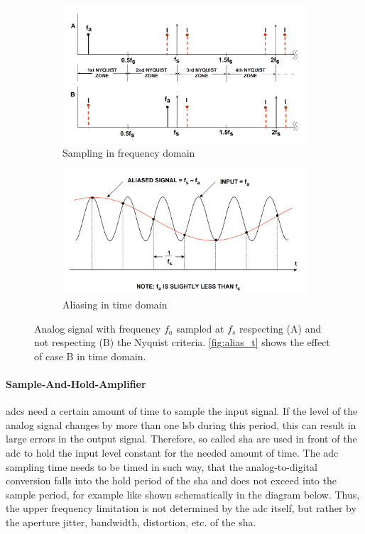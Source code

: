 \begin{figure}[tbh]
	\centering
	\begin{subfigure}{\textwidth}
		\centering
		\includegraphics[width=.6\linewidth]{chap/02-theory/img/alias_f}  
		\caption{Sampling in frequency domain}
		\label{fig:alias_f}
	\end{subfigure}
	\begin{subfigure}{\textwidth}
		\centering
		\includegraphics[width=.6\linewidth]{chap/02-theory/img/alias_t}  
		\caption{Aliasing in time domain}
		\label{fig:alias_t}
	\end{subfigure}
	\caption[Aliasing]{Analog signal with frequency $f_a$ sampled at $f_s$ respecting (A) and not respecting (B) the Nyquist criteria. \autoref{fig:alias_t} shows the effect of case B in time domain. \cite{walt}}
\end{figure}



\paragraph{Sample-And-Hold-Amplifier}
\Glspl{adc} need a certain amount of time to sample the input signal.
If the level of the analog signal changes by more than one \gls{lsb} during this period, this can result in large errors in the output signal.
Therefore, so called \gls{sha} are used in front of the \gls{adc} to hold the input level constant for the needed amount of time.
The \gls{adc} sampling time needs to be timed in such way, that the analog-to-digital conversion falls into the hold period of the \gls{sha} and does not exceed into the sample period, for example like shown schematically in the diagram below. Thus, the upper frequency limitation is not determined by the \gls{adc} itself, but rather by the aperture jitter, bandwidth, distortion, etc. of the \gls{sha}. \cite{walt}



